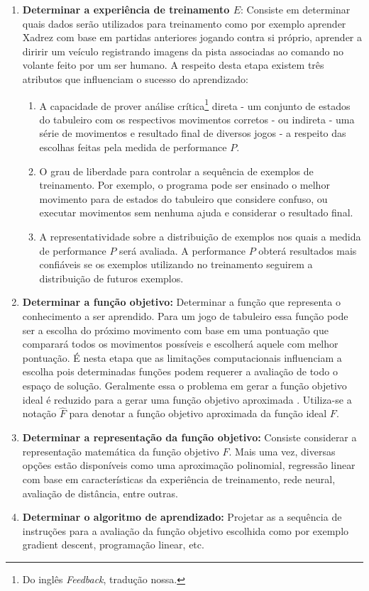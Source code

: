\begin{enumerate}
	\item \textbf{Determinar a experiência de treinamento $ E $}: Consiste em determinar quais dados serão utilizados para treinamento como por exemplo aprender Xadrez com base em partidas anteriores jogando contra si próprio, aprender a diririr um veículo registrando imagens da pista associadas ao comando no volante feito por um ser humano. A respeito desta etapa existem três atributos que influenciam o sucesso do aprendizado:
	

	\begin{enumerate}
	\item A capacidade de prover análise crítica\footnote{Do inglês \textit{Feedback}, tradução nossa.} direta - um conjunto de estados do tabuleiro com os respectivos movimentos corretos - ou indireta - uma série de movimentos e resultado final de diversos jogos - a respeito das escolhas feitas pela medida de performance $ P $. 
	\item O grau de liberdade para controlar a sequência de exemplos de treinamento. Por exemplo, o programa pode ser ensinado o melhor movimento para de estados do tabuleiro que considere confuso, ou executar movimentos sem nenhuma ajuda e considerar o resultado final.
	\item A representatividade sobre a distribuição de exemplos nos quais a medida de performance $ P $ será avaliada. A performance $ P $ obterá resultados mais confiáveis se os exemplos utilizando no treinamento seguirem a distribuição de futuros exemplos.


	\end{enumerate}
	
	\item \textbf{Determinar a função objetivo:} Determinar a função que representa o conhecimento a ser aprendido. Para um jogo de tabuleiro essa função pode ser a escolha do próximo movimento com base em uma pontuação que comparará todos os movimentos possíveis e escolherá aquele com melhor pontuação. É nesta etapa que as limitações computacionais influenciam a escolha pois determinadas funções podem requerer a avaliação de todo o espaço de solução. Geralmente essa o problema em gerar a função objetivo ideal é reduzido para a gerar uma função objetivo aproximada \cite[p.8]{Mitchell}. Utiliza-se a notação $ \hat{F} $ para denotar a função objetivo aproximada da função ideal $ F $.
	
	\item \textbf{Determinar a representação da função objetivo:} Consiste considerar a representação matemática da função objetivo $ \hat{F} $. Mais uma vez, diversas opções estão disponíveis como uma aproximação polinomial, regressão linear com base em características da experiência de treinamento, rede neural, avaliação de distância, entre outras.
	
	\item \textbf{Determinar o algoritmo de aprendizado:} Projetar as a sequência de instruções para a avaliação da função objetivo escolhida como por exemplo  gradient descent, programação linear, etc. 

\end{enumerate}

